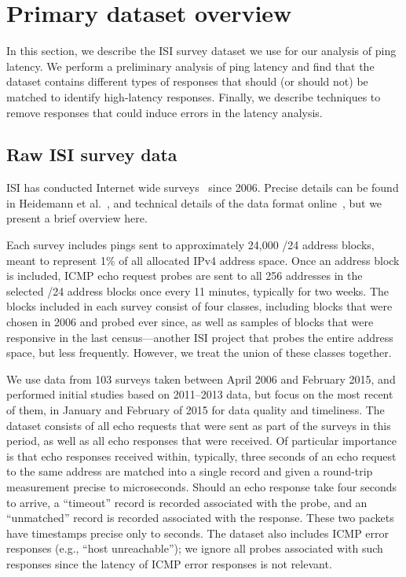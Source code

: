 \section{Primary dataset overview} %
\label{sec:dataset}

In this section, we describe the ISI survey dataset we use for our
analysis of ping latency. We perform a preliminary analysis of ping
latency and find that the dataset contains different types of
responses that should (or should not) be matched to identify
high-latency responses. Finally, we describe techniques to remove
responses that could induce errors in the latency analysis.


\subsection{Raw ISI survey data}

ISI has conducted Internet wide
surveys~\cite{census-survey} since 2006.  Precise
details can be found in Heidemann et
al.~\cite{census-survey}, and technical details
of the data format online~\cite{isi-survey-binformat}, but we present a brief
overview here.

Each survey includes pings sent to approximately 24,000 /24
address blocks, meant to represent 1\% of all allocated IPv4
address space.  Once an address block is included, ICMP echo
request probes are sent to all 256 addresses in the selected
/24 address blocks once every 11 minutes, typically for two
weeks.  The blocks included in each survey consist of four
classes, including blocks that were chosen in 2006 and
probed ever since, as well as samples of blocks that were
responsive in the last census---another ISI project that probes
the entire address space, but less frequently.  However, we treat the union of
these classes together.

We use data from 103 surveys taken between April 2006 and
February 2015, and performed initial studies based on 2011--2013 data, but focus on the most recent of them, in January and February of 2015 for data quality and timeliness.  
The dataset consists of all echo requests
that were sent as part of the surveys in this period, as
well as all echo responses that were received.  Of
particular importance is that echo responses received
within, typically, three seconds of an echo request to the
same address are matched into a single record and given a
round-trip measurement precise to microseconds.  Should an
echo response take four seconds to arrive, a ``timeout''
record is recorded associated with the probe, and an
``unmatched'' record is recorded associated with the
response.  These two packets have timestamps precise only to
seconds.  The dataset also includes ICMP error responses
(e.g., ``host unreachable''); we ignore all probes
associated with such responses since the latency of ICMP error
responses is not relevant.

